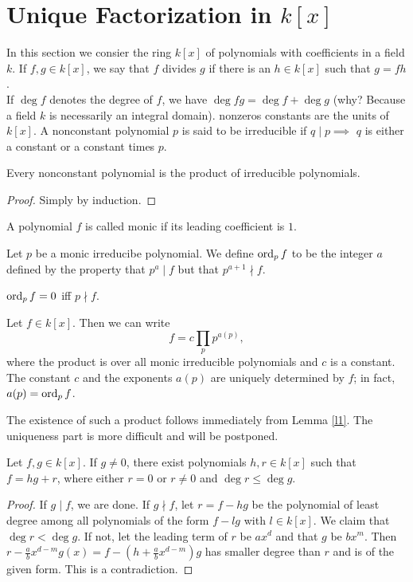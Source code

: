 \documentclass{mynotes}
\begin{document}
\section{Unique Factorization in $k[x]$}
In this section we consier the ring $k[x]$ of polynomials with coefficients in a field $k$. If $f,g\in k[x]$, we say that $f$ divides $g$ if there is an $h\in k[x]$ such that $g= fh$.\\
If $\deg{f}$ denotes the degree of $f$, we have $\deg{fg}= \deg{f}+\deg{g}$ (why? Because a field $k$ is necessarily an integral domain). nonzeros constants are the units of $k[x]$. A nonconstant polynomial $p$ is said to be irreducible if $q\mid p\implies$ $q$ is either a constant or a constant times $p$.
\begin{lemma}\label{l1}
Every nonconstant polynomial is the product of irreducible polynomials.
\end{lemma}
\begin{proof}
Simply by induction.
\end{proof}
\begin{definition}
A polynomial $f$ is called monic if its leading coefficient is $1$.
\end{definition}
\begin{definition}
Let $p$ be a monic irreducibe polynomial. We define $\mbox{ord}_{p}\,f$ to be the integer $a$ defined by the property that $p^a\mid f$ but that $p^{a+1}\nmid f$.
\end{definition}
\begin{remark}
$\mbox{ord}_{p}\,f = 0$ iff $p\nmid f$.
\end{remark}
\begin{theorem}
Let $f\in k[x]$. Then we can write$$f= c\prod_pp^{a(p)},$$ where the product is over all monic irreducible polynomials and $c$ is a constant. The constant $c$ and the exponents $a(p)$ are uniquely determined by $f$; in fact, $a(p)= \mbox{ord}_{p}\,f$.
\end{theorem}
The existence of such a product follows immediately from Lemma \ref{l1}. The uniqueness part is more difficult and will be postponed.
\begin{lemma}
Let $f,g\in k[x]$. If $g\ne 0$, there exist polynomials $h,r\in k[x]$ such that $f=hg+r$, where either $r=0$ or $r\ne0$ and $\deg{r}\le \deg{g}$.
\end{lemma}
\begin{proof}
If $g\mid f$, we are done. If $g\nmid f$, let $r= f-hg$ be the polynomial of least degree among all polynomials of the form $f-lg$ with $l\in k[x]$. We claim that $\deg{r}<\deg{g}$. If not, let the leading term of $r$ be $ax^d$ and that $g$ be $bx^m$. Then $r-\frac{a}{b}x^{d-m}g(x)= f-(h+\frac{a}{b}x^{d-m})g$ has smaller degree than $r$ and is of the given form. This is a contradiction.
\end{proof}
\end{document}
